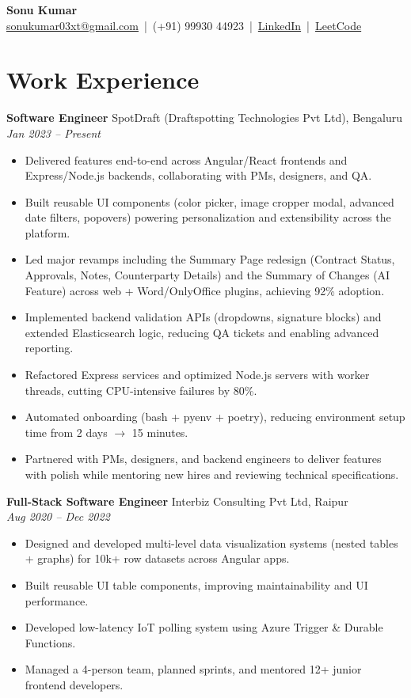 \documentclass[a4paper,10pt]{article}
\begin{document}
\begin{center}
    {\LARGE \textbf{Sonu Kumar}} \\[4pt]
    \href{mailto:sonukumar03xt@gmail.com}{sonukumar03xt@gmail.com} \,|\, (+91) 99930 44923 \,|\, 
    \href{https://www.linkedin.com/in/sonukumar03xt}{LinkedIn} \,|\, 
    \href{https://leetcode.com/sonukumar03xt}{LeetCode}
\end{center}

\section*{Work Experience}

\textbf{Software Engineer} \hfill SpotDraft (Draftspotting Technologies Pvt Ltd), Bengaluru \\
\textit{Jan 2023 -- Present}
\begin{itemize}
    \item Delivered features end-to-end across Angular/React frontends and Express/Node.js backends, collaborating with PMs, designers, and QA.
    \item Built reusable UI components (color picker, image cropper modal, advanced date filters, popovers) powering personalization and extensibility across the platform.
    \item Led major revamps including the Summary Page redesign (Contract Status, Approvals, Notes, Counterparty Details) and the Summary of Changes (AI Feature) across web + Word/OnlyOffice plugins, achieving 92\% adoption.
    \item Implemented backend validation APIs (dropdowns, signature blocks) and extended Elasticsearch logic, reducing QA tickets and enabling advanced reporting.
    \item Refactored Express services and optimized Node.js servers with worker threads, cutting CPU-intensive failures by 80\%.
    \item Automated onboarding (bash + pyenv + poetry), reducing environment setup time from 2 days $\rightarrow$ 15 minutes.
    \item Partnered with PMs, designers, and backend engineers to deliver features with polish while mentoring new hires and reviewing technical specifications.
\end{itemize}

\textbf{Full-Stack Software Engineer} \hfill Interbiz Consulting Pvt Ltd, Raipur \\
\textit{Aug 2020 -- Dec 2022}
\begin{itemize}
    \item Designed and developed multi-level data visualization systems (nested tables + graphs) for 10k+ row datasets across Angular apps.
    \item Built reusable UI table components, improving maintainability and UI performance.
    \item Developed low-latency IoT polling system using Azure Trigger \& Durable Functions.
    \item Managed a 4-person team, planned sprints, and mentored 12+ junior frontend developers.
\end{itemize}
\end{document}

